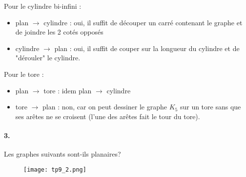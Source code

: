 \begin{solution}
Pour le cylindre bi-infini : 
\begin{itemize}
\item plan $\longrightarrow$ cylindre : oui, il suffit de découper un carré contenant le graphe et de joindre les 2 cotés opposés
\item cylindre $\longrightarrow$ plan : oui, il suffit de couper sur la longueur du cylindre et de "dérouler" le cylindre. \\
\end{itemize}

Pour le tore : 
\begin{itemize}
\item plan $\longrightarrow$ tore : idem plan $\longrightarrow$ cylindre
\item tore $\longrightarrow$ plan : non, car on peut dessiner le graphe $K_5$ sur un tore sans que ses arêtes ne se croisent (l'une des arêtes fait le tour du tore).
\end{itemize}
\end{solution}

\paragraph{3. } Les graphes suivants sont-ils planaires?

\begin{figure}[h!]
  \begin{center}
    \texttt{[image: tp9\_2.png]}
      \end{center}
\end{figure}

